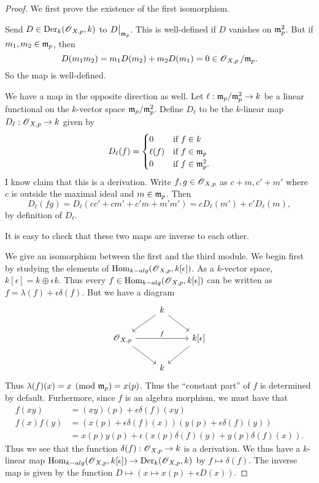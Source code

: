 \documentclass[11pt, english]{article}
\begin{document}
\begin{proof}

We first prove the existence of the first isomorphism.

Send $D \in \operatorname{Der}_k(\operatorname{\mathscr{O}}_{X,p},k)$ to $\restr{D}{\mm_p}$. This is well-defined if $D$ vanishes on $\mathfrak{m}_p^2$. But if $m_1,m_2 \in \mathfrak{m}_p$, then $$D(m_1m_2)=m_1D(m_2)+m_2D(m_1)=0 \in \operatorname{\mathscr{O}}_{X,p}/\mathfrak{m}_p.$$
So the map is well-defined.

We have a map in the opposite direction as well. Let $\ell:\mathfrak{m}_p/\mathfrak{m}_p^2 \to k$ be a linear functional on the $k$-vector space $\mathfrak{m}_p/\mathfrak{m}_p^2$. Define $D_\ell$ to be the $k$-linear map $D_\ell:\operatorname{\mathscr{O}}_{X,p} \to k$ given by
$$
D_\ell(f) = \begin{cases}
0 & \text{if $f \in k$} \\
\ell(f) & \text{if $f \in \mathfrak{m}_p$} \\
0 & \text{if $f \in \mathfrak{m}_p^2$}.
\end{cases}
$$
I know claim that this is a derivation. Write $f,g \in \operatorname{\mathscr{O}}_{X,p}$ as $c+m,c'+m'$ where $c$ is outside the maximal ideal and $m \in \mathfrak{m}_p$. Then
$$
D_\ell(fg)=D_\ell(cc'+cm'+c'm+m'm') = cD_\ell(m')+c'D_\ell(m),
$$
by definition of $D_\ell$.

It is easy to check that these two maps are inverse to each other.

We give an isomorphism between the first and the third module. We begin first by studying the elements of $\operatorname{Hom}_{k-alg}(\operatorname{\mathscr{O}}_{X,p},k[\epsilon])$. As a $k$-vector space, $k[\epsilon] = k \oplus \epsilon k$. Thus every $f \in \operatorname{Hom}_{k-alg}(\operatorname{\mathscr{O}}_{X,p},k[\epsilon])$ can be written as $f = \lambda(f) + \epsilon \delta(f)$. But we have a diagram
\[
\begin{tikzcd}
{}& k \arrow{dr} \arrow{dl} & \\
\OO_{X,p} \arrow{dr} \arrow{rr}{f} & & k[\epsilon] \arrow{dl} \\
 & k  
\end{tikzcd}
\]
Thus $\lambda(f)(x) = x \pmod {\mathfrak{m}_p}  = x(p)$. Thus the ``constant part'' of $f$ is determined by default. Furhermore, since $f$ is an algebra morphism, we must have that
\begin{align*}
  f(xy) &= (xy)(p) + \epsilon \delta(f)(xy) \\
f(x)f(y) &= (x(p)+\epsilon \delta(f)(x))(y(p)+\epsilon \delta(f)(y)) \\
&= x(p)y(p) + \epsilon \left( x(p) \delta(f)(y) + y(p) \delta(f)(x)\right).
\end{align*}
Thus we see that the function $\delta(f):\operatorname{\mathscr{O}}_{X,p} \to k$ is a derivation. We thus have a $k$-linear map $\operatorname{Hom}_{k-alg}(\operatorname{\mathscr{O}}_{X,p},k[\epsilon]) \to \operatorname{Der}_k(\operatorname{\mathscr{O}}_{X,p},k)$ by $f \mapsto \delta(f)$. The inverse map is given by the function $D \mapsto {(x \mapsto x(p) + \epsilon D(x))}$. 
\end{proof}
\end{document}
